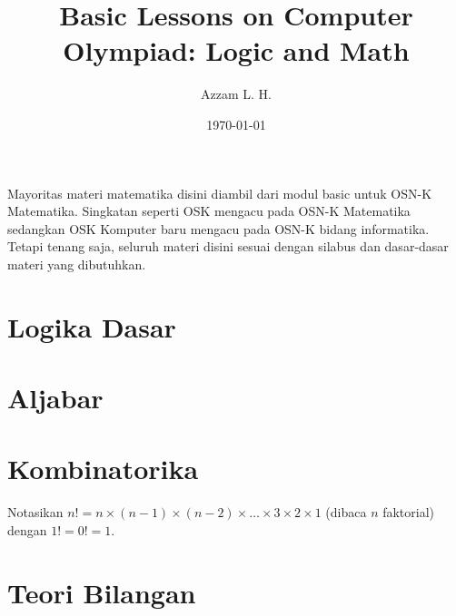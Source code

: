 \title{Basic Lessons on Computer Olympiad: Logic and Math}
\date{\today}
\author{Azzam L. H.}
\maketitle
\renewcommand*\contentsname{Daftar Isi}

\begin{remark*}
    Mayoritas materi matematika disini diambil dari modul basic untuk OSN-K Matematika. Singkatan seperti OSK mengacu pada OSN-K Matematika sedangkan OSK Komputer baru mengacu pada OSN-K bidang informatika. Tetapi tenang saja, seluruh materi disini sesuai dengan silabus dan dasar-dasar materi yang dibutuhkan.
\end{remark*}
\tableofcontents

\newpage
\section{Logika Dasar}




\section{Aljabar}





\section{Kombinatorika}
Notasikan $n!=n \times (n-1) \times (n-2) \times \dots \times 3 \times 2 \times 1$ (dibaca $n$ faktorial) dengan $1!=0!=1$.













\section{Teori Bilangan}












